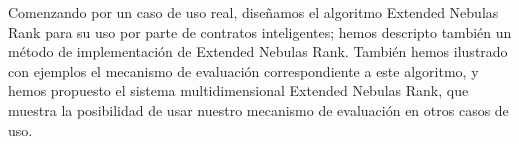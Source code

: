 \vspace{2em}

Comenzando por un caso de uso real, diseñamos el algoritmo Extended Nebulas Rank para su uso por parte de contratos inteligentes; hemos descripto también un método de implementación de Extended Nebulas Rank. También hemos ilustrado con ejemplos el mecanismo de evaluación correspondiente a este algoritmo, y hemos propuesto el sistema multidimensional Extended Nebulas Rank, que muestra la posibilidad de usar nuestro mecanismo de evaluación en otros casos de uso.